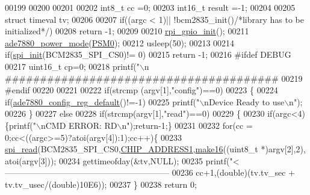 \begin{DoxyCode}
{{00199     
00200      
00201      
00202     int8\_t cc =0;
00203     int16\_t result =-1;
00204     
00205     \textcolor{keyword}{struct }timeval tv;
00206 
00207      \textcolor{keywordflow}{if}((argc < 1)|| !bcm2835\_init()\textcolor{comment}{/*library has to be initialized*/})   
00208            \textcolor{keywordflow}{return} -1;    
00209      
00210     \hyperlink{a00004_ga156b48448f55534a2f9c805a1f760efa}{rpi\_gpio\_init}();
00211     \hyperlink{a00004_gae9a5abd4e5054e7ea3f149b1764f2cd0}{ade7880\_power\_mode}(\hyperlink{a00036_ad03c0079a6239f78368cb14cc4578101}{PSM0});
00212     usleep(50);
00213     
00214     \textcolor{keywordflow}{if}(\hyperlink{a00004_ga96ddfd5c89b80852982ba50dd18256f6}{spi\_init}(BCM2835\_SPI\_CS0)!= 0)
00215     \textcolor{keywordflow}{return} -1;
00216 \textcolor{preprocessor}{        #ifdef DEBUG }
00217 \textcolor{preprocessor}{}        uint16\_t cp=0;
00218         printf(\textcolor{stringliteral}{"\(\backslash\)n
      #######################################%
00219 \textcolor{preprocessor}{        #endif}
00220 \textcolor{preprocessor}{}     
00221     
00222      \textcolor{keywordflow}{if}(strcmp (argv[1],\textcolor{stringliteral}{"config"})==0)
00223      \{
00224         \textcolor{keywordflow}{if}(\hyperlink{a00004_ga7782772c18e6ea515dcd28dcaedd0f06}{ade7880\_config\_reg\_default}()!=-1)
00225               printf(\textcolor{stringliteral}{"\(\backslash\)nDevice Ready to use\(\backslash\)n"});
00226      \} 
00227      \textcolor{keywordflow}{else} 
00228      \textcolor{keywordflow}{if}(strcmp(argv[1],\textcolor{stringliteral}{"read"})==0)   
00229      \{
00230         \textcolor{keywordflow}{if}(argc<4)\{printf(\textcolor{stringliteral}{"\(\backslash\)nCMD ERROR: RD\(\backslash\)n"});\textcolor{keywordflow}{return}-1;\}
00231           
00232         \textcolor{keywordflow}{for}(cc = 0;cc<((argc>=5)?atoi(argv[4]):1);cc++)\{
00233          \hyperlink{a00006_ga7ad9f65ee46aca507374096506a0b1c4}{spi\_read}(BCM2835\_SPI\_CS0,\hyperlink{a00036_a94de2b046db6e10257ef4481c0a15eaa}{CHIP\_ADDRESS1},\hyperlink{a00008_ga1e74920f34a07a82cca58eab71ed12b3}{make16}((uint8\_t *)argv[2],2),
      atoi(argv[3]));
00234          gettimeofday(&tv,NULL);
00235          printf(\textcolor{stringliteral}{"<----------------------------------------------------------- %
00236          cc+1,(\textcolor{keywordtype}{double})(tv.tv\_sec + tv.tv\_usec/(\textcolor{keywordtype}{double})10E6));
00237         \}
00238      \textcolor{keywordflow}{return} 0;
}}}}
\end{DoxyCode}
